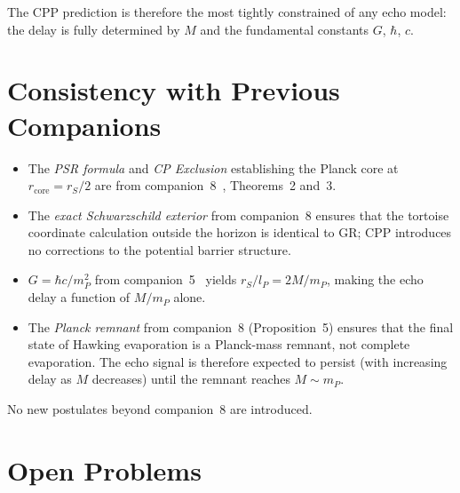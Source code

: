 \documentclass[12pt]{article}
\newcommand{\lP}{l_P}
\newcommand{\mP}{m_P}
\newcommand{\rS}{r_S}
\newcommand{\rcore}{r_{\mathrm{core}}}
\begin{document}
The CPP prediction is therefore the most tightly constrained of any echo
model: the delay is fully determined by $M$ and the fundamental constants
$G$, $\hbar$, $c$.

\section{Consistency with Previous Companions}
\label{sec:consistency}

\begin{itemize}[noitemsep]
  \item The \emph{PSR formula} and \emph{CP Exclusion} establishing the
    Planck core at $\rcore = \rS/2$ are from companion~8~\cite{c8},
    Theorems~2 and~3.
  \item The \emph{exact Schwarzschild exterior} from companion~8 ensures
    that the tortoise coordinate calculation outside the horizon is
    identical to GR; CPP introduces no corrections to the potential
    barrier structure.
  \item $G = \hbar c/\mP^2$ from companion~5~\cite{c5} yields
    $\rS/\lP = 2M/\mP$, making the echo delay a function of $M/\mP$
    alone.
  \item The \emph{Planck remnant} from companion~8 (Proposition~5)
    ensures that the final state of Hawking evaporation is a Planck-mass
    remnant, not complete evaporation.  The echo signal is therefore
    expected to persist (with increasing delay as $M$ decreases) until
    the remnant reaches $M \sim \mP$.
\end{itemize}

No new postulates beyond companion~8 are introduced.

\section{Open Problems}
\label{sec:open}
\end{document}
